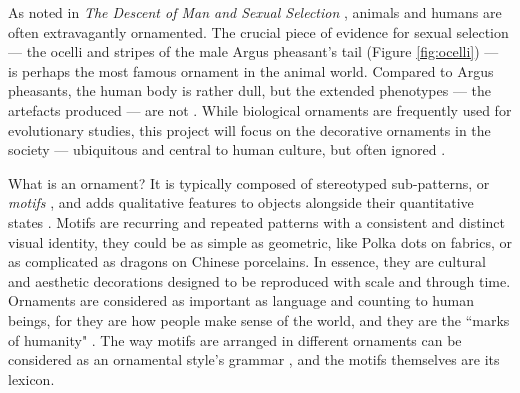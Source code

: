 \documentclass[11pt]{article}
\begin{document}
As noted in \emph{The Descent of Man and Sexual Selection} \parencite{darwin1896descent}, animals and humans are often extravagantly ornamented. The crucial piece of evidence for sexual selection --- the ocelli and stripes of the male Argus pheasant's tail (Figure \ref{fig:ocelli}) --- is perhaps the most famous ornament in the animal world. Compared to Argus pheasants, the human body is rather dull, but the extended phenotypes --- the artefacts produced --- are not \parencite{Jones1856, Gombrich1994, Trilling2001}. While biological ornaments are frequently used for evolutionary studies, this project will focus on the decorative ornaments in the society --- ubiquitous and central to human culture, but often ignored \parencite{gluaveanu2014function}.\par
What is an ornament? It is typically composed of stereotyped sub-patterns, or \emph{motifs} \parencite{Gombrich1994, Trilling2001}, and adds qualitative features to objects alongside their quantitative states \parencite{sauglam2014re}. Motifs are recurring and repeated patterns with a consistent and distinct visual identity, they could be as simple as geometric, like Polka dots on fabrics, or as complicated as dragons on Chinese porcelains. In essence, they are cultural and aesthetic decorations designed to be reproduced with scale and through time. Ornaments are considered as important as language and counting to human beings, for they are how people make sense of the world, and they are the ``marks of humanity" \parencite{brett2005rethinking}. The way motifs are arranged in different ornaments can be considered as an ornamental style's grammar \parencite{Jones1856}, and the motifs themselves are its lexicon.\par
\end{document}
